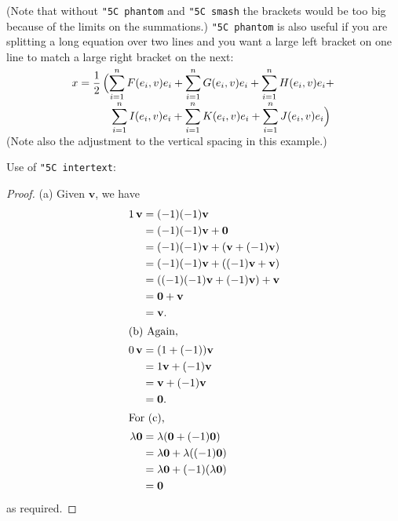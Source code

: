 \documentclass[a4paper]{article}
\newcommand{\cn}[1]{{\tt \char"5C #1}}
\begin{document}
(Note that without \cn{phantom} and \cn{smash} the brackets would be
too big because of the limits on the summations.) \cn{phantom} is
also useful if you are splitting a long equation over two lines and
you want a large left bracket on one line to match a large right bracket
on the next:
\begin{align*}
x&= \frac{1}{2} \left(\smash{\sum_{i=1}^n F(e_i,v) e_i }\vphantom{\sum}+
\smash{\sum_{i=1}^n G(e_i,v) e_i} +\smash{\sum_{i=1}^n H(e_i,v) e_i }\vphantom{\sum}+\right.\\[8pt]
&\phantom{=}\qquad\left.\smash{\sum_{i=1}^n I(e_i,v) e_i }\vphantom{\sum}+
\smash{\sum_{i=1}^n K(e_i,v) e_i} +
\smash{\sum_{i=1}^n J(e_i,v) e_i}\vphantom{\sum}\right)
\end{align*}
(Note also the adjustment to the vertical spacing in this example.)

Use of \cn{intertext}:
\begin{proof} (a) Given $\mathbf v$, we have
\begin{align*}
1\,\mathbf v &= (-1)(-1)\mathbf v \\
&=(-1)(-1)\mathbf v +\mathbf 0  \\
&=(-1)(-1)\mathbf v + (\mathbf v + (-1)\mathbf v) \\
&=(-1)(-1)\mathbf v + ((-1)\mathbf v + \mathbf v) \\
&=((-1)(-1)\mathbf v + (-1)\mathbf v) + \mathbf v \\
&= \mathbf 0+\mathbf v \\
&= \mathbf v. \\
\intertext{(b) Again,}
0\,\mathbf v &= (1+(-1))\mathbf v \\
&= 1\mathbf v+(-1)\mathbf v\\
&= \mathbf v+(-1)\mathbf v \\
&= \mathbf 0.\\
\intertext{For (c),}
\lambda \mathbf 0 &= \lambda(\mathbf 0 + (-1)\mathbf 0) \\
&= \lambda \mathbf 0 + \lambda((-1)\mathbf 0) \\
&= \lambda \mathbf 0 + (-1)(\lambda \mathbf 0) \\
&=\mathbf 0 
\end{align*}
as required.
\end{proof}
\end{document}
